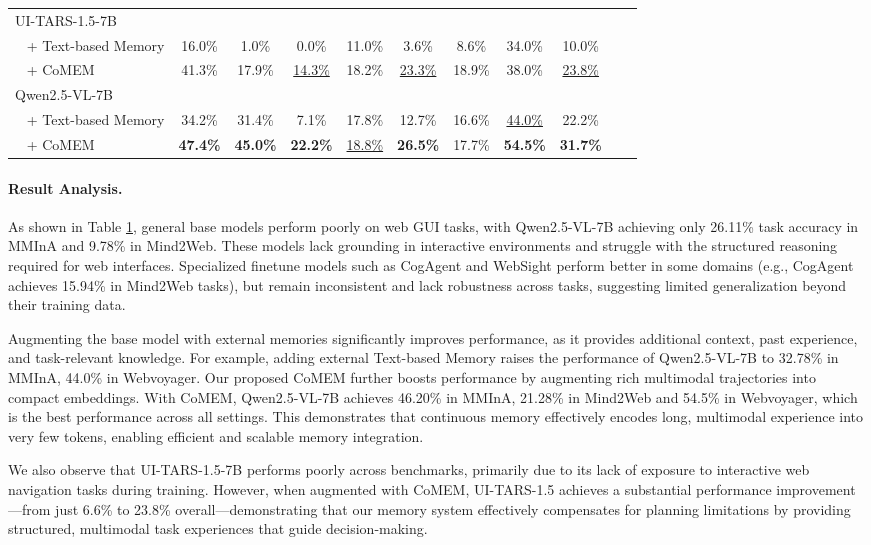 \documentclass{article} %
\begin{document}
\begin{table}[h]
{\begin{tabular}{lcccccccccc}
UI-TARS-1.5-7B & & & & & & & & \\
~ + Text-based Memory  & 16.0\% & 1.0\% & 0.0\% & 11.0\% & 3.6\% & 8.6\% & 34.0\% & 10.0\% \\
\rowcolor{cyan!8}
~ + CoMEM  & 41.3\% & 17.9\% & \underline{14.3\%} & 18.2\% & \underline{23.3\%} & 18.9\% & 38.0\% & \underline{23.8\%} \\
Qwen2.5-VL-7B  & & & & & & & & \\
~ + Text-based Memory  & 34.2\% & 31.4\% & 7.1\% & 17.8\% & 12.7\% & 16.6\% & \underline{44.0\%} & 22.2\% \\
\rowcolor{cyan!8}
~ + CoMEM & \textbf{47.4\%} & \textbf{45.0\%} & \textbf{22.2\%} & \underline{18.8\%} & \textbf{26.5\%} & 17.7\% & \textbf{54.5\%} & \textbf{31.7\%} \\
\bottomrule
\end{tabular}%
}
\label{tab:memory-model-comparison}
\end{table}

\paragraph{Result Analysis.}
As shown in Table \ref{tab:memory-model-comparison}, general base models perform poorly on web GUI tasks, with Qwen2.5-VL-7B achieving only 26.11\%  task accuracy in MMInA and 9.78\% in Mind2Web. These models lack grounding in interactive environments and struggle with the structured reasoning required for web interfaces. Specialized finetune models such as CogAgent and WebSight perform better in some domains (e.g., CogAgent achieves 15.94\% in Mind2Web tasks), but remain inconsistent and lack robustness across tasks, suggesting limited generalization beyond their training data.

Augmenting the base model with external memories significantly improves performance, as it provides additional context, past experience, and task-relevant knowledge. For example, adding external Text-based Memory raises the performance of Qwen2.5-VL-7B to 32.78\% in MMInA, 44.0\% in Webvoyager. Our proposed CoMEM further boosts performance by augmenting rich multimodal trajectories into compact embeddings. With CoMEM, Qwen2.5-VL-7B achieves 46.20\% in MMInA, 21.28\% in Mind2Web and 54.5\% in Webvoyager, which is the best performance across all settings. This demonstrates that continuous memory effectively encodes long, multimodal  experience into very few tokens, enabling efficient and scalable memory integration.

We also observe that UI-TARS-1.5-7B performs poorly across benchmarks, primarily due to its lack of exposure to interactive web navigation tasks during training. However, when augmented with CoMEM, UI-TARS-1.5 achieves a substantial performance improvement—from just 6.6\% to 23.8\% overall—demonstrating that our memory system effectively compensates for planning limitations by providing structured, multimodal task experiences that guide decision-making.
\end{document}
